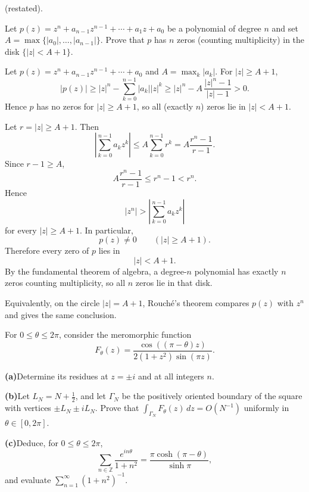 \begin{problem}[CP-IV-0079]
\label{prob:cp-iv-0079}
(restated).

Let $p(z)=z^{n}+a_{n-1}z^{n-1}+\cdots+a_1 z+a_0$ be a polynomial of degree $n$ and set
$A=\max\{|a_0|,\dots,|a_{n-1}|\}$. Prove that $p$ has $n$ zeros
(counting multiplicity) in the disk $\{|z|<A+1\}$.

Let $p(z)=z^{n}+a_{n-1}z^{n-1}+\cdots+a_0$ and $A=\max_{k}|a_k|$. For $|z|\ge A+1$,
\[
|p(z)|\ge |z|^{n}-\sum_{k=0}^{n-1}|a_k||z|^{k}
\ge |z|^{n}-A\,\frac{|z|^{n}-1}{|z|-1}>0.
\]
Hence $p$ has no zeros for $|z|\ge A+1$, so all (exactly $n$) zeros lie in $|z|<A+1$.

\medskip
\end{problem}

\begin{solution}
Let \(r=|z|\ge A+1\). Then
\[
\left|\sum_{k=0}^{n-1}a_kz^k\right|
\le
A\sum_{k=0}^{n-1}r^k
=
A\frac{r^n-1}{r-1}.
\]
Since \(r-1\ge A\),
\[
A\frac{r^n-1}{r-1}
\le
r^n-1
<
r^n.
\]
Hence
\[
|z^n|
>
\left|\sum_{k=0}^{n-1}a_kz^k\right|
\]
for every \(|z|\ge A+1\). In particular,
\[
p(z)\neq0
\qquad (|z|\ge A+1).
\]
Therefore every zero of \(p\) lies in
\[
|z|<A+1.
\]
By the fundamental theorem of algebra, a degree-\(n\) polynomial has exactly \(n\) zeros counting multiplicity, so all \(n\) zeros lie in that disk.

Equivalently, on the circle \(|z|=A+1\), Rouch\'e's theorem compares \(p(z)\) with \(z^n\) and gives the same conclusion.
\end{solution}


\begin{problem}[CP-IV-0098]
\label{prob:cp-iv-0098}
For $0\le\theta\le2\pi$, consider the meromorphic function
\[
F_\theta(z)=\frac{\cos((\pi-\theta)z)}{2(1+z^2)\sin(\pi z)}.
\]

\par\medskip\noindent\textbf{(a)}\quad Determine its residues at $z=\pm i$ and at all integers $n$.

\par\medskip\noindent\textbf{(b)}\quad Let $L_N=N+\tfrac12$, and let $\Gamma_N$ be the positively oriented boundary of the square with vertices $\pm L_N\pm iL_N$. Prove that $\int_{\Gamma_N}F_\theta(z)\,dz=O(N^{-1})$ uniformly in $\theta\in[0,2\pi]$.

\par\medskip\noindent\textbf{(c)}\quad Deduce, for $0\le\theta\le2\pi$,
\[
\sum_{n\in\mathbb Z}\frac{e^{in\theta}}{1+n^2}
=\frac{\pi\cosh(\pi-\theta)}{\sinh\pi},
\]
and evaluate $\sum_{n=1}^\infty(1+n^2)^{-1}$.

\end{problem}

